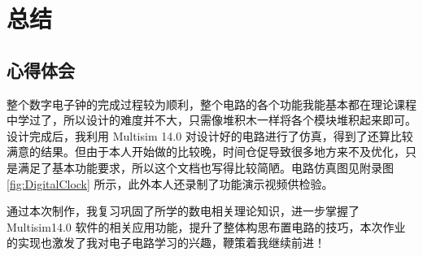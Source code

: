 \section{总结}

\subsection{心得体会}

整个数字电子钟的完成过程较为顺利，整个电路的各个功能我能基本都在理论课程中学过了，所以设计的难度并不大，只需像堆积木一样将各个模块堆积起来即可。设计完成后，我利用 Multisim 14.0 对设计好的电路进行了仿真，得到了还算比较满意的结果。但由于本人开始做的比较晚，时间仓促导致很多地方来不及优化，只是满足了基本功能要求，所以这个文档也写得比较简陋。电路仿真图见附录图 \ref{fig:DigitalClock} 所示，此外本人还录制了功能演示视频供检验。

通过本次制作，我复习巩固了所学的数电相关理论知识，进一步掌握了 Multisim14.0 软件的相关应用功能，提升了整体构思布置电路的技巧，本次作业的实现也激发了我对电子电路学习的兴趣，鞭策着我继续前进！